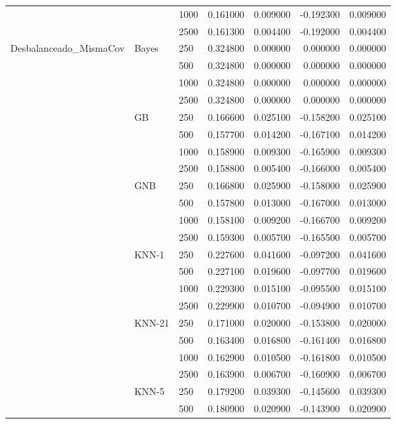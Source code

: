 \begin{tabular}{lllrrrr}
 &  & 1000 & 0.161000 & 0.009000 & -0.192300 & 0.009000 \\
 &  & 2500 & 0.161300 & 0.004400 & -0.192000 & 0.004400 \\
\cline{1-7} \cline{2-7}
\multirow[t]{32}{*}{Desbalanceado_MismaCov} & \multirow[t]{4}{*}{Bayes} & 250 & 0.324800 & 0.000000 & 0.000000 & 0.000000 \\
 &  & 500 & 0.324800 & 0.000000 & 0.000000 & 0.000000 \\
 &  & 1000 & 0.324800 & 0.000000 & 0.000000 & 0.000000 \\
 &  & 2500 & 0.324800 & 0.000000 & 0.000000 & 0.000000 \\
\cline{2-7}
 & \multirow[t]{4}{*}{GB} & 250 & 0.166600 & 0.025100 & -0.158200 & 0.025100 \\
 &  & 500 & 0.157700 & 0.014200 & -0.167100 & 0.014200 \\
 &  & 1000 & 0.158900 & 0.009300 & -0.165900 & 0.009300 \\
 &  & 2500 & 0.158800 & 0.005400 & -0.166000 & 0.005400 \\
\cline{2-7}
 & \multirow[t]{4}{*}{GNB} & 250 & 0.166800 & 0.025900 & -0.158000 & 0.025900 \\
 &  & 500 & 0.157800 & 0.013000 & -0.167000 & 0.013000 \\
 &  & 1000 & 0.158100 & 0.009200 & -0.166700 & 0.009200 \\
 &  & 2500 & 0.159300 & 0.005700 & -0.165500 & 0.005700 \\
\cline{2-7}
 & \multirow[t]{4}{*}{KNN-1} & 250 & 0.227600 & 0.041600 & -0.097200 & 0.041600 \\
 &  & 500 & 0.227100 & 0.019600 & -0.097700 & 0.019600 \\
 &  & 1000 & 0.229300 & 0.015100 & -0.095500 & 0.015100 \\
 &  & 2500 & 0.229900 & 0.010700 & -0.094900 & 0.010700 \\
\cline{2-7}
 & \multirow[t]{4}{*}{KNN-21} & 250 & 0.171000 & 0.020000 & -0.153800 & 0.020000 \\
 &  & 500 & 0.163400 & 0.016800 & -0.161400 & 0.016800 \\
 &  & 1000 & 0.162900 & 0.010500 & -0.161800 & 0.010500 \\
 &  & 2500 & 0.163900 & 0.006700 & -0.160900 & 0.006700 \\
\cline{2-7}
 & \multirow[t]{4}{*}{KNN-5} & 250 & 0.179200 & 0.039300 & -0.145600 & 0.039300 \\
 &  & 500 & 0.180900 & 0.020900 & -0.143900 & 0.020900 \\

\end{tabular}
